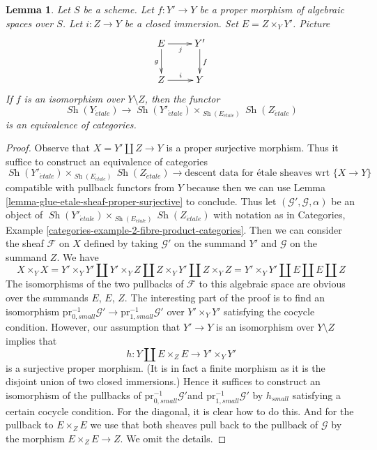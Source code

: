 \documentclass{stacks-project}
\theoremstyle{plain}
\newtheorem{lemma}[subsection]{Lemma}
\theoremstyle{definition}
\theoremstyle{remark}
\numberwithin{equation}{subsection}
\def\Sh{\mathop{\mathit{Sh}}\nolimits}
\def\etale{{\acute{e}tale}}
\begin{document}
\begin{lemma}
\label{lemma-glue-etale-sheaf-modification}
Let $S$ be a scheme. Let $f : Y' \to Y$ be a proper morphism of
algebraic spaces over $S$. Let $i : Z \to Y$
be a closed immersion. Set $E = Z \times_Y Y'$. Picture
$$
\xymatrix{
E \ar[d]_g \ar[r]_j & Y' \ar[d]^f \\
Z \ar[r]^i & Y
}
$$
If $f$ is an isomorphism over $Y \setminus Z$, then the functor
$$
\Sh(Y_\etale)
\longrightarrow
\Sh(Y'_\etale) \times_{\Sh(E_\etale)} \Sh(Z_\etale)
$$
is an equivalence of categories.
\end{lemma}

\begin{proof}
Observe that $X = Y' \coprod Z \to Y$ is a proper surjective morphism.
Thus it suffice to construct an equivalence of categories
$$
\Sh(Y'_\etale) \times_{\Sh(E_\etale)} \Sh(Z_\etale)
\longrightarrow
\text{descent data for \'etale sheaves wrt }\{X \to Y\}
$$
compatible with pullback functors from $Y$
because then we can use Lemma \ref{lemma-glue-etale-sheaf-proper-surjective}
to conclude. Thus let $(\mathcal{G}', \mathcal{G}, \alpha)$ be an
object of $\Sh(Y'_\etale) \times_{\Sh(E_\etale)} \Sh(Z_\etale)$ with
notation as in Categories, Example
\ref{categories-example-2-fibre-product-categories}.
Then we can consider the sheaf $\mathcal{F}$ on $X$ defined
by taking $\mathcal{G}'$ on the summand $Y'$ and $\mathcal{G}$
on the summand $Z$. We have
$$
X \times_Y X = Y' \times_Y Y' \amalg
Y' \times_Y Z \amalg Z \times_Y Y' \amalg Z \times_Y Z =
Y' \times_Y Y' \amalg E \amalg E \amalg Z
$$
The isomorphisms of the two pullbacks of $\mathcal{F}$ to this algebraic
space are obvious over the summands $E$, $E$, $Z$. The interesting
part of the proof is to find an isomorphism
$\text{pr}_{0, small}^{-1}\mathcal{G}' \to
\text{pr}_{1, small}^{-1}\mathcal{G}'$
over $Y' \times_Y Y'$ satisfying the cocycle condition.
However, our assumption that $Y' \to Y$ is an isomorphism
over $Y \setminus Z$ implies that
$$
h : Y \coprod E \times_Z E \longrightarrow Y' \times_Y Y'
$$
is a surjective proper morphism. (It is in fact a finite morphism
as it is the disjoint union of two closed immersions.)
Hence it suffices to construct an isomorphism of the pullbacks
of $\text{pr}_{0, small}^{-1}\mathcal{G}'$and
$\text{pr}_{1, small}^{-1}\mathcal{G}'$ by $h_{small}$ satisfying
a certain cocycle condition. For the diagonal, it is clear
how to do this. And for the pullback to $E \times_Z E$
we use that both sheaves pull back to the pullback of
$\mathcal{G}$ by the morphism $E \times_Z E \to Z$.
We omit the details.
\end{proof}
\end{document}

